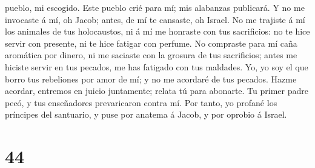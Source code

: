 pueblo, mi escogido.  Este pueblo crié para mí; mis
alabanzas publicará.  Y no me invocaste á mí, oh Jacob;
antes, de mí te cansaste, oh Israel.  No me trajiste á mí
los animales de tus holocaustos, ni á mí me honraste con tus
sacrificios: no te hice servir con presente, ni te hice fatigar con
perfume.  No compraste para mí caña aromática por dinero,
ni me saciaste con la grosura de tus sacrificios; antes me hiciste
servir en tus pecados, me has fatigado con tus maldades. 
Yo, yo soy el que borro tus rebeliones por amor de mí; y no me acordaré
de tus pecados.  Hazme acordar, entremos en juicio
juntamente; relata tú para abonarte.  Tu primer padre pecó,
y tus enseñadores prevaricaron contra mí.  Por tanto, yo
profané los príncipes del santuario, y puse por anatema á Jacob, y por
oprobio á Israel.

\hypertarget{section-43}{%
\section{44}\label{section-43}}

